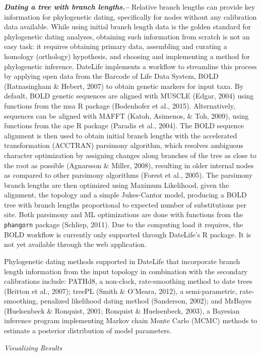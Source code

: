 \documentclass[english,man]{apa6}
\begin{document}
\textbf{\emph{Dating a tree with branch lengths.--}}
Relative branch lengths can provide key information for phylogenetic dating, specifically for nodes without any calibration data available.
While using initial branch length data is the golden standard for phylogenetic dating analyses, obtaining such information from scratch is not an easy task: it requires obtaining primary data, assembling and curating a homology (orthology) hypothesis, and choosing and implementing a method for phylogenetic inference.
DateLife implements a workflow to streamline this process by applying open data from the Barcode of Life Data System, BOLD (Ratnasingham \& Hebert, 2007) to obtain genetic markers for input taxa.
By default, BOLD genetic sequences are aligned with MUSCLE (Edgar, 2004) using functions from the msa R package (Bodenhofer et al., 2015). Alternatively, sequences can be aligned with MAFFT (Katoh, Asimenos, \& Toh, 2009), using functions from the ape R package (Paradis et al., 2004).
The BOLD sequence alignment is then used to obtain initial branch lengths with the accelerated transformation (ACCTRAN) parsimony algorithm, which resolves ambiguous character optimization by assigning changes along branches of the tree as close to the root as possible (Agnarsson \& Miller, 2008), resulting in older internal nodes as compared to other parsimony algorithms (Forest et al., 2005). The parsimony branch lengths are then optimized using Maximum Likelihood, given the alignment, the topology and a simple Jukes-Cantor model, producing a BOLD tree with branch lengths proportional to expected number of substitutions per site. Both parsimony and ML optimizations are done with functions from the \texttt{phangorn} package (Schliep, 2011).
Due to the computing load it requires, the BOLD workflow is currently only supported through DateLife's R package. It is not yet available through the web application.

Phylogenetic dating methods supported in DateLife that incorporate branch length information from the input topology in combination with the secondary calibrations include:
PATHd8, a non-clock, rate-smoothing method to date trees (Britton et al., 2007);
treePL (Smith \& O'Meara, 2012), a semi-parametric, rate-smoothing, penalized likelihood dating method (Sanderson, 2002);
and MrBayes (Huelsenbeck \& Ronquist, 2001; Ronquist \& Huelsenbeck, 2003), a Bayesian inference program implementing Markov chain Monte Carlo (MCMC) methods to estimate a posterior distribution of model parameters.

\begin{center}
\emph{Visualizing Results}
\end{center}
\end{document}
